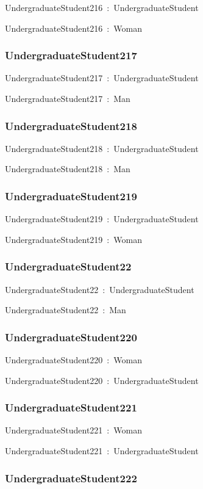 \documentclass{article}
\begin{document}
UndergraduateStudent216~:~UndergraduateStudent

UndergraduateStudent216~:~Woman

\subsubsection*{UndergraduateStudent217}

UndergraduateStudent217~:~UndergraduateStudent

UndergraduateStudent217~:~Man

\subsubsection*{UndergraduateStudent218}

UndergraduateStudent218~:~UndergraduateStudent

UndergraduateStudent218~:~Man

\subsubsection*{UndergraduateStudent219}

UndergraduateStudent219~:~UndergraduateStudent

UndergraduateStudent219~:~Woman

\subsubsection*{UndergraduateStudent22}

UndergraduateStudent22~:~UndergraduateStudent

UndergraduateStudent22~:~Man

\subsubsection*{UndergraduateStudent220}

UndergraduateStudent220~:~Woman

UndergraduateStudent220~:~UndergraduateStudent

\subsubsection*{UndergraduateStudent221}

UndergraduateStudent221~:~Woman

UndergraduateStudent221~:~UndergraduateStudent

\subsubsection*{UndergraduateStudent222}
\end{document}
